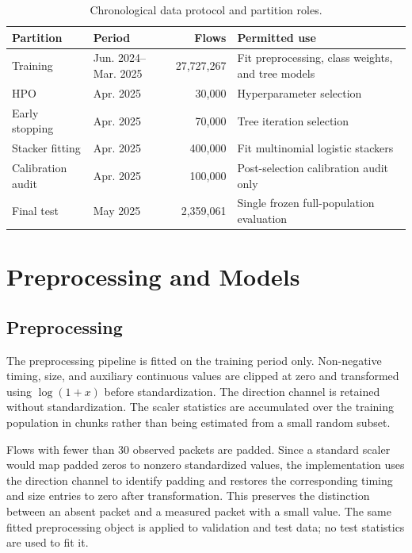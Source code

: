 \documentclass[conference]{IEEEtran}
\begin{document}
\begin{table}[t]
\centering
\caption{Chronological data protocol and partition roles.}
\label{tab:split}
\small
\begin{tabular}{p{}p{}rp{}}
\toprule
Partition & Period & Flows & Permitted use \\
\midrule
Training & Jun. 2024--Mar. 2025 & 27,727,267 & Fit preprocessing, class weights, and tree models \\
HPO & Apr. 2025 & 30,000 & Hyperparameter selection \\
Early stopping & Apr. 2025 & 70,000 & Tree iteration selection \\
Stacker fitting & Apr. 2025 & 400,000 & Fit multinomial logistic stackers \\
Calibration audit & Apr. 2025 & 100,000 & Post-selection calibration audit only \\
Final test & May 2025 & 2,359,061 & Single frozen full-population evaluation \\
\bottomrule
\end{tabular}
\end{table}

\section{Preprocessing and Models}
\label{sec:method}

\subsection{Preprocessing}

The preprocessing pipeline is fitted on the training period only. Non-negative timing, size, and auxiliary continuous values are clipped at zero and transformed using $\log(1+x)$ before standardization. The direction channel is retained without standardization. The scaler statistics are accumulated over the training population in chunks rather than being estimated from a small random subset.

Flows with fewer than 30 observed packets are padded. Since a standard scaler would map padded zeros to nonzero standardized values, the implementation uses the direction channel to identify padding and restores the corresponding timing and size entries to zero after transformation. This preserves the distinction between an absent packet and a measured packet with a small value. The same fitted preprocessing object is applied to validation and test data; no test statistics are used to fit it.
\end{document}
